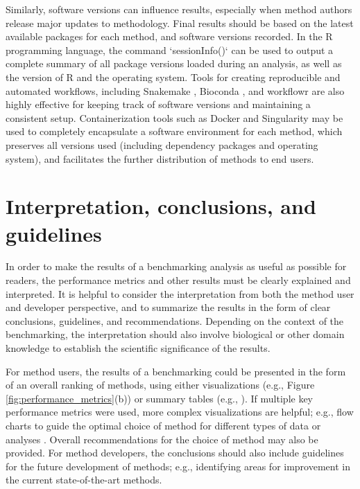 \documentclass[12pt, a4paper]{article}
\begin{document}
Similarly, software versions can influence results, especially when method authors release major updates to methodology. Final results should be based on the latest available packages for each method, and software versions recorded. In the R programming language, the command `sessionInfo()` can be used to output a complete summary of all package versions loaded during an analysis, as well as the version of R and the operating system. Tools for creating reproducible and automated workflows, including Snakemake \citep{Koster2012}, Bioconda \citep{Gruning2018}, and workflowr \citep{Blischak2018} are also highly effective for keeping track of software versions and maintaining a consistent setup. Containerization tools such as Docker and Singularity may be used to completely encapsulate a software environment for each method, which preserves all versions used (including dependency packages and operating system), and facilitates the further distribution of methods to end users.




\section*{Interpretation, conclusions, and guidelines}

In order to make the results of a benchmarking analysis as useful as possible for readers, the performance metrics and other results must be clearly explained and interpreted. It is helpful to consider the interpretation from both the method user and developer perspective, and to summarize the results in the form of clear conclusions, guidelines, and recommendations. Depending on the context of the benchmarking, the interpretation should also involve biological or other domain knowledge to establish the scientific significance of the results.

For method users, the results of a benchmarking could be presented in the form of an overall ranking of methods, using either visualizations (e.g., Figure \ref{fig:performance_metrics}(b)) or summary tables (e.g., \citep{Aghaeepour2013, Weber2016}). If multiple key performance metrics were used, more complex visualizations are helpful; e.g., flow charts to guide the optimal choice of method for different types of data or analyses \citep{Saelens2018b}. Overall recommendations for the choice of method may also be provided. For method developers, the conclusions should also include guidelines for the future development of methods; e.g., identifying areas for improvement in the current state-of-the-art methods.
\end{document}

